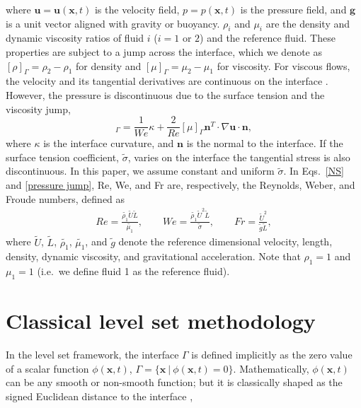 \noindent where ${\bm u}={\bm u}({\bm x},t)$ is the velocity field, $p=p({\bm x},t)$ is the pressure field, and $\bm{g}$ is a unit vector aligned with gravity or buoyancy. $\rho_i$ and $\mu_i$ are the density and dynamic viscosity ratios of fluid $i$ ($i=1$ or $2$) and the reference fluid. These properties are  subject to a jump across the interface, which we denote as $[\rho]_\Gamma=\rho_2-\rho_1$ for density and $[\mu]_\Gamma=\mu_2-\mu_1$ for viscosity. For viscous flows, the velocity and its tangential derivatives are continuous on the interface \citep{Liu_JCP_1994}. However, the pressure is discontinuous due to the surface tension and the viscosity jump, \ie
\begin{equation}
    [p]_\Gamma = \frac{1}{We} \kappa + \frac{2}{Re}[\mu]_\Gamma {\bm n}^T \cdot \nabla {\bm u} \cdot {\bm n},
  \label{pressure jump}
\end{equation}
\noindent where $\kappa$ is the interface curvature, and ${\bm n}$ is the normal to the interface.  
If the surface tension coefficient, $\tilde{\sigma}$, varies on the interface the tangential stress is also discontinuous. In this paper, we assume constant and uniform $\tilde{\sigma}$. In Eqs.\ \eqref{NS} and \eqref{pressure jump}, Re, We, and Fr are, respectively, the Reynolds, Weber, and Froude numbers, defined as
\begin{equation}
  \begin{aligned}
    Re = \frac{\tilde{\rho_1} \tilde{U} \tilde{L}}{\tilde{\mu_1}},\quad \quad We = \frac{\tilde{\rho_1} \tilde{U}^2 \tilde{L}}{\tilde{\sigma}},\quad \quad Fr=\frac{\tilde{U}^2}{\tilde{g}\tilde{L}},      
  \label{non-di}    
  \end{aligned}
\end{equation}
\noindent where $\tilde{U}$, $\tilde{L}$, $\tilde{\rho_1}$, $\tilde{\mu_1}$, and $\tilde{g}$ denote the reference dimensional velocity, length, density, dynamic viscosity, and gravitational acceleration. Note that $\rho_1=1$ and $\mu_1=1$ (i.e.\ we define fluid 1 as the reference fluid).




\section{Classical level set methodology}
\label{subsec: dls}

In the level set framework, the interface $\Gamma$ is defined implicitly as the zero value of a scalar function $\phi({\bm x},t)$, \ie $\Gamma = \{ {\bm x} ~ \rvert ~ \phi({\bm x},t) = 0 \}$. Mathematically, $\phi({\bm x},t)$ can be any smooth or non-smooth function; but it is classically shaped as the signed Euclidean distance to the interface \cite{Mulder_JCP_1992, Sussman_JCP_1994}, \viz

